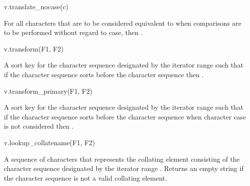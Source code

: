 \begin{itemdecl}
v.translate_nocase(c)
\end{itemdecl}

\begin{itemdescr}
\pnum
\result
{}

\pnum
\returns
For all characters  that are to be considered equivalent to 
when comparisons are to be performed without regard to case,
then .
\end{itemdescr}

\begin{itemdecl}
v.transform(F1, F2)
\end{itemdecl}

\begin{itemdescr}
\pnum
\result
{}

\pnum
\returns
A sort key for the character sequence designated by
the iterator range  such that
if the character sequence  sorts before
the character sequence 
then .
\end{itemdescr}

\begin{itemdecl}
v.transform_primary(F1, F2)
\end{itemdecl}

\begin{itemdescr}
\pnum
{}%
%
\result
{}

\pnum
\returns
A sort key for the character sequence designated by
the iterator range  such that
if the character sequence  sorts before
the character sequence 
when character case is not considered
then .
\end{itemdescr}

\begin{itemdecl}
v.lookup_collatename(F1, F2)
\end{itemdecl}

\begin{itemdescr}
\pnum
\result
{}

\pnum
\returns
A sequence of characters that represents the collating element
consisting of the character sequence designated by
the iterator range .
Returns an empty string
if the character sequence is not a valid collating element.
\end{itemdescr}


